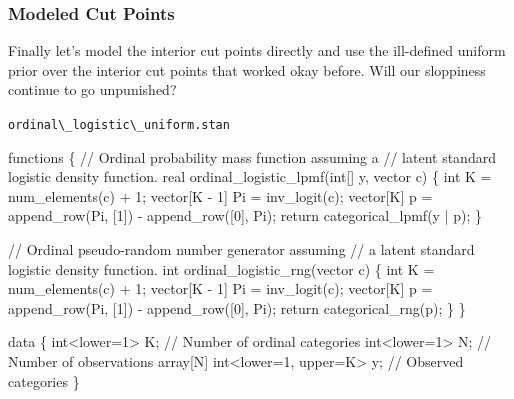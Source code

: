 \documentclass[
  letterpaper,
  DIV=11,
  numbers=noendperiod]{scrartcl}
\newenvironment{Shaded}{\begin{snugshade}}{\end{snugshade}}
\newcommand{\CommentTok}[1]{\textcolor[rgb]{0.37,0.37,0.37}{#1}}
\newcommand{\ControlFlowTok}[1]{\textcolor[rgb]{0.00,0.23,0.31}{#1}}
\newcommand{\DataTypeTok}[1]{\textcolor[rgb]{0.68,0.00,0.00}{#1}}
\newcommand{\DecValTok}[1]{\textcolor[rgb]{0.68,0.00,0.00}{#1}}
\newcommand{\KeywordTok}[1]{\textcolor[rgb]{0.00,0.23,0.31}{#1}}
\newcommand{\NormalTok}[1]{\textcolor[rgb]{0.00,0.23,0.31}{#1}}
\begin{document}
\subsubsection{Modeled Cut Points}\label{modeled-cut-points-1}

Finally let's model the interior cut points directly and use the
ill-defined uniform prior over the interior cut points that worked okay
before. Will our sloppiness continue to go unpunished?

\begin{codelisting}

\caption{\texttt{ordinal\textbackslash\_logistic\textbackslash\_uniform.stan}}

\begin{Shaded}
\begin{Highlighting}[]
\KeywordTok{functions}\NormalTok{ \{}
  \CommentTok{// Ordinal probability mass function assuming a}
  \CommentTok{// latent standard logistic density function.}
  \DataTypeTok{real}\NormalTok{ ordinal\_logistic\_lpmf(}\DataTypeTok{int}\NormalTok{[] y, }\DataTypeTok{vector}\NormalTok{ c) \{}
    \DataTypeTok{int}\NormalTok{ K = num\_elements(c) + }\DecValTok{1}\NormalTok{;}
    \DataTypeTok{vector}\NormalTok{[K {-} }\DecValTok{1}\NormalTok{] Pi = inv\_logit(c);}
    \DataTypeTok{vector}\NormalTok{[K] p = append\_row(Pi, [}\DecValTok{1}\NormalTok{]\textquotesingle{}) {-} append\_row([}\DecValTok{0}\NormalTok{]\textquotesingle{}, Pi);}
    \ControlFlowTok{return}\NormalTok{ categorical\_lpmf(y | p);}
\NormalTok{  \}}

  \CommentTok{// Ordinal pseudo{-}random number generator assuming}
  \CommentTok{// a latent standard logistic density function.}
  \DataTypeTok{int}\NormalTok{ ordinal\_logistic\_rng(}\DataTypeTok{vector}\NormalTok{ c) \{}
    \DataTypeTok{int}\NormalTok{ K = num\_elements(c) + }\DecValTok{1}\NormalTok{;}
    \DataTypeTok{vector}\NormalTok{[K {-} }\DecValTok{1}\NormalTok{] Pi = inv\_logit(c);}
    \DataTypeTok{vector}\NormalTok{[K] p = append\_row(Pi, [}\DecValTok{1}\NormalTok{]\textquotesingle{}) {-} append\_row([}\DecValTok{0}\NormalTok{]\textquotesingle{}, Pi);}
    \ControlFlowTok{return}\NormalTok{ categorical\_rng(p);}
\NormalTok{  \}}
\NormalTok{\}}

\KeywordTok{data}\NormalTok{ \{}
  \DataTypeTok{int}\NormalTok{\textless{}}\KeywordTok{lower}\NormalTok{=}\DecValTok{1}\NormalTok{\textgreater{} K;                   }\CommentTok{// Number of ordinal categories}
  \DataTypeTok{int}\NormalTok{\textless{}}\KeywordTok{lower}\NormalTok{=}\DecValTok{1}\NormalTok{\textgreater{} N;                   }\CommentTok{// Number of observations}
  \DataTypeTok{array}\NormalTok{[N] }\DataTypeTok{int}\NormalTok{\textless{}}\KeywordTok{lower}\NormalTok{=}\DecValTok{1}\NormalTok{, }\KeywordTok{upper}\NormalTok{=K\textgreater{} y; }\CommentTok{// Observed categories}
\NormalTok{\}}


\end{Highlighting}
\end{Shaded}
\end{codelisting}
\end{document}

